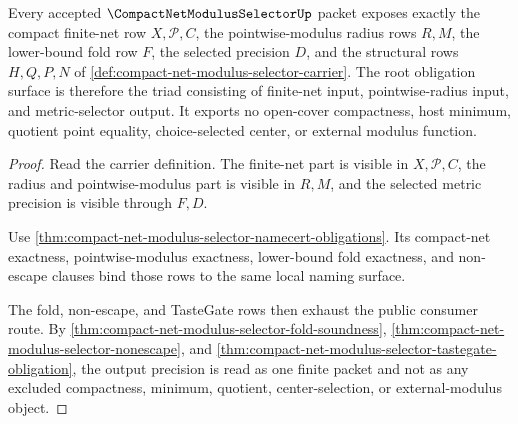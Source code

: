 \begin{theorem}
\label{thm:compact-net-modulus-selector-root-obligation-triad}
Every accepted $\CompactNetModulusSelectorUp$ packet exposes exactly the compact finite-net row $X,\mathcal{P},C$, the pointwise-modulus radius rows $R,M$, the lower-bound fold row $F$, the selected precision $D$, and the structural rows $H,Q,P,N$ of \autoref{def:compact-net-modulus-selector-carrier}. The root obligation surface is therefore the triad consisting of finite-net input, pointwise-radius input, and metric-selector output. It exports no open-cover compactness, host minimum, quotient point equality, choice-selected center, or external modulus function.
\end{theorem}
\begin{proof}
Read the carrier definition. The finite-net part is visible in $X,\mathcal{P},C$, the radius and pointwise-modulus part is visible in $R,M$, and the selected metric precision is visible through $F,D$.

Use \autoref{thm:compact-net-modulus-selector-namecert-obligations}. Its compact-net exactness, pointwise-modulus exactness, lower-bound fold exactness, and non-escape clauses bind those rows to the same local naming surface.

The fold, non-escape, and TasteGate rows then exhaust the public consumer route. By \autoref{thm:compact-net-modulus-selector-fold-soundness}, \autoref{thm:compact-net-modulus-selector-nonescape}, and \autoref{thm:compact-net-modulus-selector-tastegate-obligation}, the output precision is read as one finite packet and not as any excluded compactness, minimum, quotient, center-selection, or external-modulus object.
\end{proof}

